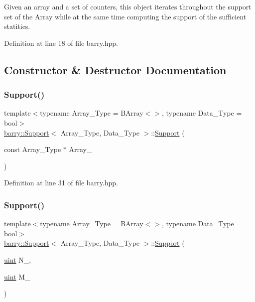Given an array and a set of counters, this object iterates throughout the support set of the Array while at the same time computing the support of the sufficient statitics. 

Definition at line 18 of file barry.\+hpp.



\subsection{Constructor \& Destructor Documentation}
\mbox{\label{classbarry_1_1_support_ab946f83af83c571de8bd5a17ce453240}} 
\subsubsection{\texorpdfstring{Support()}{Support()}\hspace{0.1cm}{\footnotesize\ttfamily [1/2]}}
{\footnotesize\ttfamily template$<$typename Array\+\_\+\+Type  = B\+Array$<$$>$, typename Data\+\_\+\+Type  = bool$>$ \\
\hyperlink{classbarry_1_1_support}{barry\+::\+Support}$<$ Array\+\_\+\+Type, Data\+\_\+\+Type $>$\+::\hyperlink{classbarry_1_1_support}{Support} (\begin{DoxyParamCaption}\item[{const Array\+\_\+\+Type $\ast$}]{Array\+\_\+ }\end{DoxyParamCaption})\hspace{0.3cm}{\ttfamily [inline]}}



Definition at line 31 of file barry.\+hpp.

\mbox{\label{classbarry_1_1_support_aa451bd21c09935b686869fef96c5b874}} 
\subsubsection{\texorpdfstring{Support()}{Support()}\hspace{0.1cm}{\footnotesize\ttfamily [2/2]}}
{\footnotesize\ttfamily template$<$typename Array\+\_\+\+Type  = B\+Array$<$$>$, typename Data\+\_\+\+Type  = bool$>$ \\
\hyperlink{classbarry_1_1_support}{barry\+::\+Support}$<$ Array\+\_\+\+Type, Data\+\_\+\+Type $>$\+::\hyperlink{classbarry_1_1_support}{Support} (\begin{DoxyParamCaption}\item[{\hyperlink{namespacebarry_a11dfc53ddb4672278319aa04f1e09a6c}{uint}}]{N\+\_\+,  }\item[{\hyperlink{namespacebarry_a11dfc53ddb4672278319aa04f1e09a6c}{uint}}]{M\+\_\+ }\end{DoxyParamCaption})\hspace{0.3cm}{\ttfamily [inline]}}



